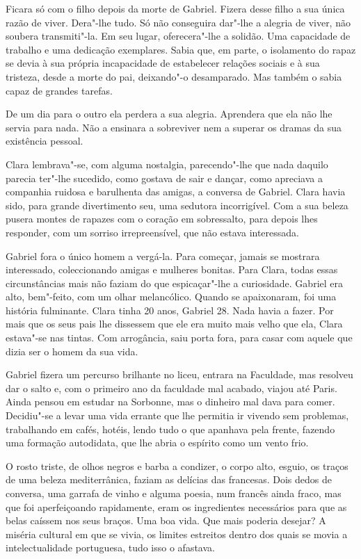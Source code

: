 Ficara só com o filho depois da morte de Gabriel. Fizera desse filho a
sua única razão de viver. Dera"-lhe tudo. Só não conseguira dar"-lhe a
alegria de viver, não soubera transmiti"-la. Em seu lugar, oferecera"-lhe
a solidão. Uma capacidade de trabalho e uma dedicação exemplares. Sabia
que, em parte, o isolamento do rapaz se devia à sua própria incapacidade
de estabelecer relações sociais e à sua tristeza, desde a morte do pai,
deixando"-o desamparado. Mas também o sabia capaz de grandes tarefas.

De um dia para o outro ela perdera a sua alegria. Aprendera que ela não
lhe servia para nada. Não a ensinara a sobreviver nem a superar os
dramas da sua existência pessoal.

Clara lembrava"-se, com alguma nostalgia, parecendo"-lhe que nada daquilo
parecia ter"-lhe sucedido, como gostava de sair e dançar, como apreciava
a companhia ruidosa e barulhenta das amigas, a conversa de Gabriel.
Clara havia sido, para grande divertimento seu, uma sedutora
incorrigível. Com a sua beleza pusera montes de rapazes com o coração em
sobressalto, para depois lhes responder, com um sorriso irrepreensível,
que não estava interessada.

Gabriel fora o único homem a vergá-la. Para começar, jamais se mostrara
interessado, coleccionando amigas e mulheres bonitas. Para Clara, todas
essas circunstâncias mais não faziam do que espicaçar"-lhe a curiosidade.
Gabriel era alto, bem"-feito, com um olhar melancólico. Quando se
apaixonaram, foi uma história fulminante. Clara tinha 20 anos, Gabriel
28. Nada havia a fazer. Por mais que os seus pais lhe dissessem que ele
era muito mais velho que ela, Clara estava"-se nas tintas. Com
arrogância, saiu porta fora, para casar com aquele que dizia ser o homem
da sua vida.

Gabriel fizera um percurso brilhante no liceu, entrara na Faculdade, mas
resolveu dar o salto e, com o primeiro ano da faculdade mal acabado,
viajou até Paris. Ainda pensou em estudar na Sorbonne, mas o dinheiro
mal dava para comer. Decidiu"-se a levar uma vida errante que lhe
permitia ir vivendo sem problemas, trabalhando em cafés, hotéis, lendo
tudo o que apanhava pela frente, fazendo uma formação autodidata, que
lhe abria o espírito como um vento frio.

O rosto triste, de olhos negros e barba a condizer, o corpo alto,
esguio, os traços de uma beleza mediterrânica, faziam as delícias das
francesas. Dois dedos de conversa, uma garrafa de vinho e alguma poesia,
num francês ainda fraco, mas que foi aperfeiçoando rapidamente, eram os
ingredientes necessários para que as belas caíssem nos seus braços. Uma
boa vida. Que mais poderia desejar? A miséria cultural em que se vivia,
os limites estreitos dentro dos quais se movia a intelectualidade
portuguesa, tudo isso o afastava.

